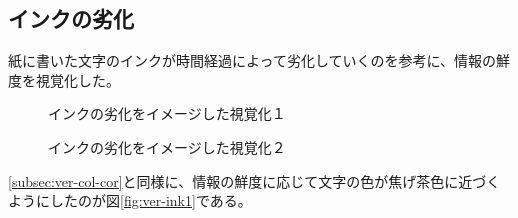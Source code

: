 \subsection{インクの劣化}
\label{subsec:ver-col-ink}

紙に書いた文字のインクが時間経過によって劣化していくのを参考に、情報の鮮度を視覚化した。

\begin{figure}[htbp]
  \begin{minipage}{0.5\hsize}
    \begin{center}
    \end{center}
    \caption{インクの劣化をイメージした視覚化１}
    \label{fig:ver-ink1}
  \end{minipage}
  \begin{minipage}{0.5\hsize}
    \begin{center}
    \end{center}
    \caption{インクの劣化をイメージした視覚化２}
    \label{fig:ver-ink2}
  \end{minipage}
\end{figure}

\ref{subsec:ver-col-cor}と同様に、情報の鮮度に応じて文字の色が焦げ茶色に近づくようにしたのが図\ref{fig:ver-ink1}である。

